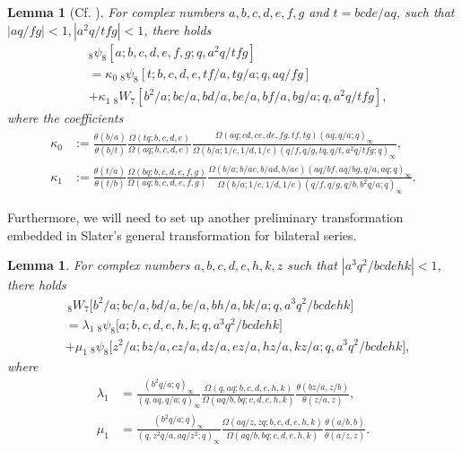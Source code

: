 \documentclass[xits,review,sort&compress]{elsarticle}
\newtheorem{yl}[dl]{Lemma}
\numberwithin{equation}{section}
\newcommand{\poq}[2]{(#1;q)_{#2}}
\begin{document}
\begin{yl}[Cf. {\rm \cite[Thm. 4]{wei}}]\label{wei-identity} For complex numbers $a,b,c,d,e,f,g$ and $t=bcde/aq$, such that  $|aq/fg|<1, |a^2q/tfg|<1$, there holds
\begin{equation}\label{wei}\begin{aligned}
&{}_{8} \psi_{8}\left[a ; b, c, d, e, f, g ; q, a^{2}q /t fg\right] \\
&=\kappa_0~{}_{8} \psi_{8}[t ; b, c, d, e, t f / a, t g / a ; q, aq / f g]
\\
&+\kappa_1~{}_{8}W_{7}\left[b^{2} / a ; b c / a, b d / a, b e / a, b f / a, b g / a ; q, a^{2}q /t f g\right],
\end{aligned}
\end{equation}
where the coefficients
\begin{subequations}\label{weiid-coeff}
\begin{align}
\kappa_0&:=\frac{\theta(b/a)}{\theta(b/t)}
\frac{\Omega(tq;b,c,d,e)}{\Omega(aq;b,c,d,e)}\frac{\Omega(aq;cd,ce,de,fg,tf,tg)(aq, q / a; q)_{\infty}}{\Omega(b/a;1/c,1/d,1/e)\left(q / f, q / g, tq, q / t, a^{2}q /tfg ; q\right)_{\infty}}, \label{weiid-coeffa}\\
\kappa_1&:=\frac{\theta\left(t/a\right)}{\theta\left(t/b\right)}
\frac{\Omega(bq;b,c,d,e,f,g)}{\Omega(aq;b,c,d,e,f,g)}
\frac{\Omega(b/a;b/ac,b/ad,b/ae)(aq / b f, aq / b g, q / a, aq; q)_{\infty}}{\Omega(b/a;1/c,1/d,1/e)\left(q / f, q / g, q / b, b^{2}q / a ; q\right)_{\infty}}.
\end{align}
\end{subequations}
\end{yl}

Furthermore, we will need to set up another preliminary transformation embedded  in Slater's general transformation for  bilateral series.

\begin{yl}\label{maincoroll-wei}  For complex numbers $a,b,c,d,e,h,k,z$  such that  $|a^3q^2/bcdehk|<1$, there holds
\begin{align}
&\,{}_{8}W_{7}\big[b^2/a;b c  /a,b d  /a,b e  /a,b h  /a,b k  /a;q,a^3 q^2/bcdehk\big]\nonumber\\
&=\lambda_1~{}_{8}\psi_{8}\big[a;b,c,d,e,h,k;q,a^3 q^2/bcdehk\big]\label{wanted}\\
&+\mu_1~{}_{8}\psi_{8}\big[z^2/a;b z/a, c  z/a,d  z/a,e  z/a,h z/a,k z/a;q,a^3 q^2/bcdehk\big],\nonumber
\end{align}
where
\begin{subequations}\label{lambdamu}
\begin{align}\label{lambdamu-1}
 \lambda_1 &=\frac{\poq{b^2 q/a}{\infty}}{\poq{q,aq,q/a}{\infty}}\frac{\Omega(q,aq;b,c,d,e,h,k)}{\Omega(aq/b,bq;c,d,e,h,k)}
\frac{\theta(bz/a,z/b)}{\theta(z/a,z)}, \\
 \mu_1 &=\frac{\poq{b^2 q/a}{\infty}}{\poq{q,z^2 q/a,aq/z^2}{\infty}}
\frac{\Omega(aq/z,zq;b,c,d,e,h,k)}{\Omega(aq/b,bq;c,d,e,h,k)} \frac{\theta(a/b,b)}{\theta(a/z,z)}.
\end{align}
\end{subequations}
\end{yl}
\end{document}
